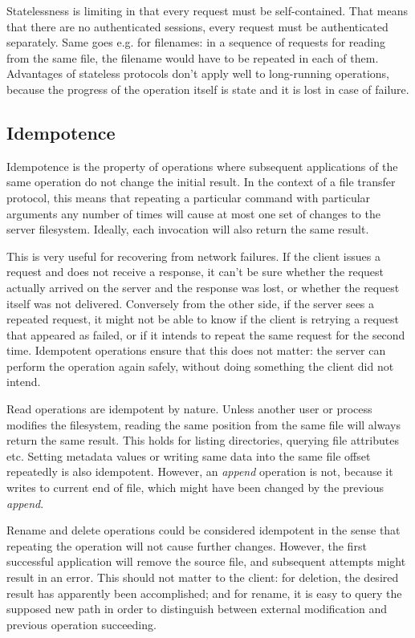 Statelessness is limiting in that every request must be self-contained. That means that there are no
authenticated sessions, every request must be authenticated separately. Same goes e.g. for filenames: in
a sequence of requests for reading from the same file, the filename would have to be repeated in each of them.
Advantages of stateless protocols don't apply well to long-running operations, because the progress of the
operation itself is state and it is lost in case of failure.

\subsection{Idempotence}

Idempotence is the property of operations where subsequent applications of the same operation do not change
the initial result. In the context of a file transfer protocol, this means that repeating a particular command
with particular arguments any number of times will cause at most one set of changes to the server filesystem.
Ideally, each invocation will also return the same result.

This is very useful for recovering from network failures. If the client issues a request and does not receive
a response, it can't be sure whether the request actually arrived on the server and the response was lost, or
whether the request itself was not delivered. Conversely from the other side, if the server sees a repeated
request, it might not be able to know if the client is retrying a request that appeared as failed, or if it
intends to repeat the same request for the second time. Idempotent operations ensure that this does not
matter: the server can perform the operation again safely, without doing something the client did not intend.

Read operations are idempotent by nature. Unless another user or process modifies the filesystem, reading the
same position from the same file will always return the same result.  This holds for listing directories,
querying file attributes etc. Setting metadata values or writing same data into the same file offset
repeatedly is also idempotent. However, an {\it append} operation is not, because it writes to current end of
file, which might have been changed by the previous {\it append}.

Rename and delete operations could be considered idempotent in the sense that repeating the operation will not
cause further changes. However, the first successful application will remove the source file, and subsequent
attempts might result in an error. This should not matter to the client: for deletion, the desired result has
apparently been accomplished; and for rename, it is easy to query the supposed new path in order to
distinguish between external modification and previous operation succeeding.

